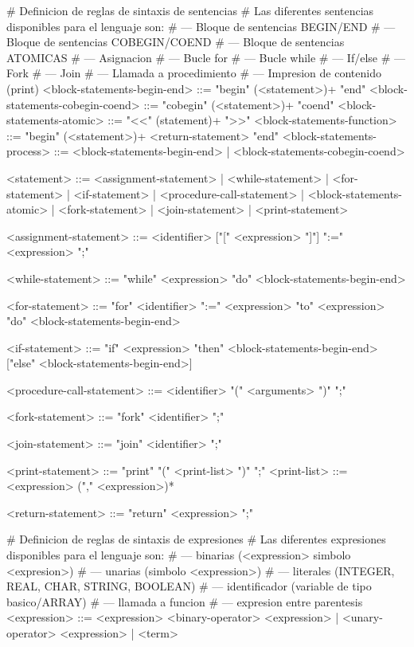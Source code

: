\begin{BNFCode}
# Definicion de reglas de sintaxis de sentencias
# Las diferentes sentencias disponibles para el lenguaje son:
#   --- Bloque de sentencias BEGIN/END
#   --- Bloque de sentencias COBEGIN/COEND
#   --- Bloque de sentencias ATOMICAS
#   --- Asignacion
#   --- Bucle for
#   --- Bucle while
#   --- If/else
#   --- Fork
#   --- Join
#   --- Llamada a procedimiento
#   --- Impresion de contenido (print)
<block-statements-begin-end> ::= "begin" (<statement>)+ "end"
<block-statements-cobegin-coend> ::= "cobegin" 
    (<statement>)+ "coend"
<block-statements-atomic> ::= "<<" (statement)+ ">>"
<block-statements-function> ::= "begin" (<statement>)+ 
    <return-statement> "end"
<block-statements-process> ::= <block-statements-begin-end>
    | <block-statements-cobegin-coend>
	
<statement> ::= <assignment-statement>
    | <while-statement>
    | <for-statement>
    | <if-statement>
    | <procedure-call-statement>
    | <block-statements-atomic>
    | <fork-statement>
    | <join-statement>
    | <print-statement>
	
<assignment-statement> ::= <identifier> ["[" <expression> "]"] 
    ":=" <expression> ";"
    
<while-statement> ::= "while" <expression> "do" 
    <block-statements-begin-end>
    
<for-statement> ::= "for" <identifier> ":=" <expression> "to" 
    <expression> "do" <block-statements-begin-end>
    
<if-statement> ::= "if" <expression> "then" 
    <block-statements-begin-end> 
    ["else" <block-statements-begin-end>]
    
<procedure-call-statement> ::= <identifier> "(" <arguments> ")" ";"

<fork-statement> ::= "fork" <identifier> ";"

<join-statement> ::= "join" <identifier> ";"

<print-statement> ::= "print" "(" <print-list> ")" ";"
<print-list> ::= <expression> ("," <expression>)*

<return-statement> ::= "return" <expression> ";"

# Definicion de reglas de sintaxis de expresiones
# Las diferentes expresiones disponibles para el lenguaje son:
#   --- binarias (<expression> simbolo <expresion>)
#   --- unarias  (simbolo <expression>)
#   --- literales (INTEGER, REAL, CHAR, STRING, BOOLEAN)
#   --- identificador (variable de tipo basico/ARRAY)
#   --- llamada a funcion
#   --- expresion entre parentesis
<expression> ::= <expression> <binary-operator> <expression>
	| <unary-operator> <expression>
	| <term>


\end{BNFCode}
